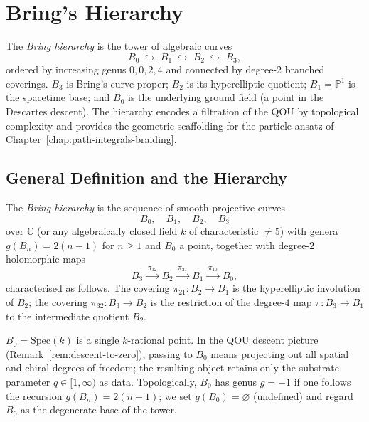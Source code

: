 
\chapter{Bring's Hierarchy}
\label{chap:brings-hierarchy}
\label{chap:brings-surface}%

The \emph{Bring hierarchy} is the tower of algebraic curves
\[
  B_0 \;\hookrightarrow\; B_1 \;\hookrightarrow\; B_2 \;\hookrightarrow\; B_3,
\]
ordered by increasing genus $0, 0, 2, 4$ and connected by degree-$2$
branched coverings.  $B_3$ is Bring's curve proper; $B_2$ is its
hyperelliptic quotient; $B_1 = \mathbb{P}^1$ is the spacetime base;
and $B_0$ is the underlying ground field (a point in the Descartes
descent).  The hierarchy encodes a filtration of the QOU by topological
complexity and provides the geometric scaffolding for the particle
ansatz of Chapter~\ref{chap:path-integrals-braiding}.


\section{General Definition and the Hierarchy}
\label{sec:hierarchy-general}

\begin{definition}
\label{def:bring-hierarchy}
The \emph{Bring hierarchy} is the sequence of smooth projective curves
\[
  B_0,\quad B_1,\quad B_2,\quad B_3
\]
over $\mathbb{C}$ (or any algebraically closed field $k$ of
characteristic $\neq 5$) with genera $g(B_n) = 2(n-1)$ for $n\ge 1$
and $B_0$ a point, together with degree-$2$ holomorphic maps
\[
  B_3 \xrightarrow{\;\pi_{32}\;} B_2
  \xrightarrow{\;\pi_{21}\;} B_1
  \xrightarrow{\;\pi_{10}\;} B_0,
\]
characterised as follows.  The covering $\pi_{21}\colon B_2\to B_1$ is
the hyperelliptic involution of $B_2$; the covering
$\pi_{32}\colon B_3\to B_2$ is the restriction of the degree-$4$ map
$\pi\colon B_3\to B_1$ to the intermediate quotient $B_2$.
\end{definition}

\begin{remark}
\label{rem:B0-point}
$B_0 = \mathrm{Spec}(k)$ is a single $k$-rational point.  In the QOU
descent picture (Remark~\ref{rem:descent-to-zero}), passing to $B_0$
means projecting out all spatial and chiral degrees of freedom; the
resulting object retains only the substrate parameter $q \in [1,\infty)$
as data.  Topologically, $B_0$ has genus $g = -1$ if one follows the
recursion $g(B_n)=2(n-1)$; we set $g(B_0)=\varnothing$ (undefined) and
regard $B_0$ as the degenerate base of the tower.
\end{remark}

